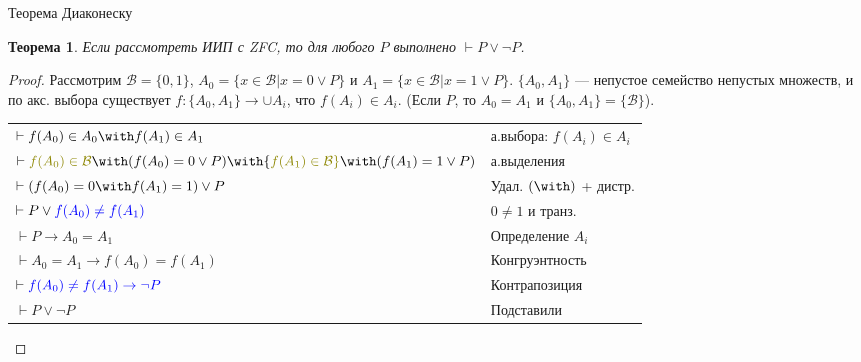 \documentclass[aspectratio=169]{beamer}
\newtheorem{thm}{Теорема}[section]
\begin{document}
\begin{frame}{Теорема Диаконеску}
\begin{thm}Если рассмотреть ИИП с ZFC, то для любого $P$ выполнено $\vdash P \vee \neg P$.\end{thm}
\begin{proof}Рассмотрим $\mathcal{B} = \{0,1\}$, $A_0 = \{ x \in \mathcal{B} | x = 0 \vee P \}$ и 
$A_1 = \{ x \in \mathcal{B} | x = 1 \vee P\}$.
$\{A_0,A_1\}$ --- непустое семейство непустых множеств, и по акс. выбора существует
$f: \{A_0,A_1\} \rightarrow \cup A_i$, что $f(A_i) \in A_i$. (Если $P$, то $A_0 = A_1$ и $\{A_0,A_1\} = \{\mathcal{B}\}$).

\vspace{0.3cm}
\begin{tabular}{ll}
$\vdash f(A_0) \in A_0 \with f(A_1) \in A_1$ & а.выбора: $f(A_i) \in A_i$\\
$\vdash {\color{olive}f(A_0) \in \mathcal{B}} \with (f(A_0) = 0 \vee P) \with {\color{olive}f(A_1) \in \mathcal{B}} \with (f(A_1) = 1 \vee P)$ & а.выделения\\
$\vdash (f(A_0) = 0 \with f(A_1) = 1) \vee P$ & Удал. $(\with)$ + дистр.\\
$\vdash P\vee{\color{blue}f(A_0) \ne f(A_1)}$ & $0 \ne 1$ и транз.\\\pause
$\vdash P \rightarrow A_0 = A_1$ & Определение $A_i$\\
$\vdash A_0 = A_1 \rightarrow f(A_0) = f(A_1)$ & Конгруэнтность\\
$\vdash \color{blue} f(A_0) \ne f(A_1) \rightarrow \neg P$ & Контрапозиция\\
$\vdash P \vee \neg P$ & Подставили
\end{tabular}
\end{proof}
\end{frame}
\end{document}
